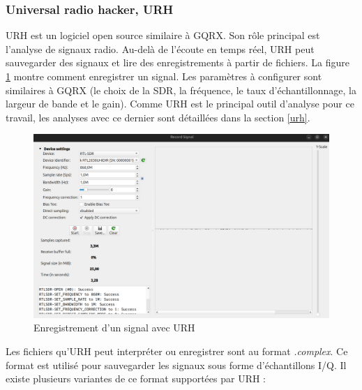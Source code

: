 \subsubsection{Universal radio hacker, URH}


\ac{URH} est un logiciel open source similaire à GQRX. Son rôle principal est l'analyse de signaux radio. Au-delà de l'écoute en temps réel, \ac{URH} peut sauvegarder des signaux et lire des enregistrements à partir de fichiers. La figure \ref{term39} montre comment enregistrer un signal. Les paramètres à configurer sont similaires à GQRX (le choix de la \ac{SDR}, la fréquence, le taux d'échantillonnage, la largeur de bande et le gain). Comme \ac{URH} est le principal outil d'analyse pour ce travail, les analyses avec ce dernier sont détaillées dans la section \ref{urh}.

\begin{figure}[h]
\centering

\includegraphics[scale=0.16]{images/urh1.png}
\caption{Enregistrement d'un signal avec URH}\label{term39}
\end{figure}

\newpage

Les fichiers qu'\ac{URH} peut interpréter ou enregistrer sont au format \textit{.complex}. Ce format est utilisé pour sauvegarder les signaux sous forme d'échantillons \ac{I/Q}. Il existe plusieurs variantes de ce format supportées par \ac{URH} :

\vspace{0.1cm}

